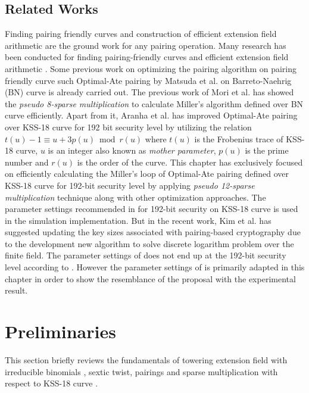 \subsection{Related Works}
\label{sec:ch:icisc:related_works}
Finding pairing friendly curves \cite{EPRINT:FreScoTes06} and construction of efficient extension field arithmetic are the ground work for any pairing operation.
Many research has been conducted for finding pairing-friendly curves \cite{SCN:BarLynSco02, JC:DupEngMor05} and efficient extension field arithmetic \cite{JC:BaiPaa01}.
Some previous work on optimizing the pairing algorithm on pairing friendly curve such Optimal-Ate pairing by Matsuda et al. \cite{EPRINT:MKHO07} on Barreto-Naehrig (BN) curve \cite{SAC:BarNae05} is already carried out.
The previous work of Mori et al. \cite{PAIRING:MANS13} has showed the \textit{pseudo 8-sparse multiplication} to calculate Miller's algorithm defined over BN curve efficiently. Apart from it, Aranha et al. \cite{PAIRING:AFKMR12} has improved Optimal-Ate pairing over KSS-18 curve for 192 bit security level by utilizing the relation $t(u) - 1 \equiv u + 3p(u) \bmod r(u)$ where $t(u)$ is the Frobenius trace of KSS-18 curve, $u$ is an integer also known as \textit{mother parameter}, $p(u)$ is the prime number and $r(u)$ is the order of the curve. This chapter has exclusively focused on efficiently calculating the Miller's loop of Optimal-Ate pairing defined over KSS-18 curve \cite{EPRINT:KacSchSco07} for 192-bit security level by applying\textit{ pseudo 12-sparse multiplication} technique along with other optimization approaches. The parameter settings recommended in \cite{PAIRING:AFKMR12} for 192-bit security on KSS-18 curve is used in the simulation implementation. But in the recent work, Kim et al. \cite{C:KimBar16} has suggested updating the key sizes associated with pairing-based cryptography due to the development new algorithm to solve discrete logarithm problem over the finite field. The parameter settings of \cite{PAIRING:AFKMR12} does not end up at the 192-bit security level according to \cite{C:KimBar16}. However the parameter settings of \cite{PAIRING:AFKMR12}  is primarily adapted in this chapter in order to show the resemblance of the proposal with the experimental result.

\section{Preliminaries}
\label{sec:ch:icisc:preliminaries}
This section briefly reviews the fundamentals of towering extension field with irreducible binomials \cite{JC:BaiPaa01}, sextic twist, pairings and sparse multiplication \cite{PAIRING:MANS13} with respect to KSS-18 curve \cite{EPRINT:KacSchSco07}.
